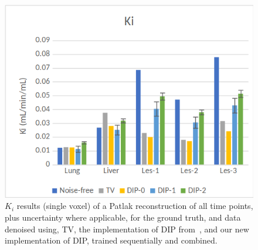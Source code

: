         \begin{figure}
            \centering
            
            \includegraphics[width=1.0\linewidth]{figures/deep_image_prior_results_ki.png}
            
            \captionsetup{singlelinecheck=false, justification=centering}
            \caption{
                $K_i$ results (single voxel) of a Patlak reconstruction of all time points, plus uncertainty where applicable, for the ground truth, and data denoised using, \gls{TV}, the implementation of \gls{DIP} from~\parencite{Gong2019PETPrior}, and our new implementation of \gls{DIP}, trained sequentially and combined.
            }
            \label{fig:pseudo_bayesian_dip_denoising_as_a_preprocessing_step_for_kinetic_modelling_in_dynamic_pet_appendix_results_ki}
        \end{figure}
        
